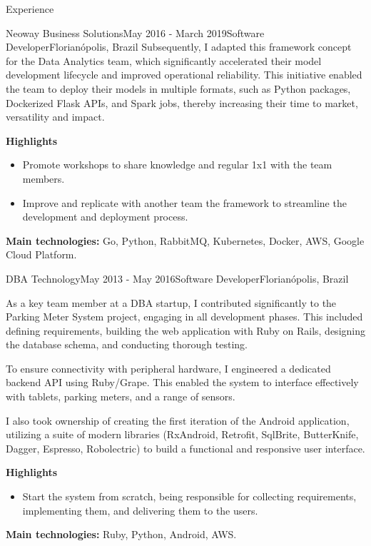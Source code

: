 \documentclass[
	a4paper, %
	10pt, %
]{resume} %
\begin{document}
\begin{rSection}{Experience}
\begin{rSubsection}{Neoway Business Solutions}{May 2016 - March 2019}{Software Developer}{Florianópolis, Brazil}
		Subsequently, I adapted this framework concept for the Data Analytics team, which significantly accelerated their model development lifecycle and improved operational reliability.
		This initiative enabled the team to deploy their models in multiple formats, such as Python packages, Dockerized Flask APIs, and Spark jobs, thereby increasing their time to market, versatility and impact.

		\textbf{Highlights}
		\begin{itemize}
			\item Promote workshops to share knowledge and regular 1x1 with the team members.
			\item Improve and replicate with another team the framework to streamline the development and deployment process.
		\end{itemize}

		\textbf{Main technologies:}
			Go, Python, RabbitMQ, Kubernetes, Docker, AWS, Google Cloud Platform.

	\end{rSubsection}


	\begin{rSubsection}{DBA Technology}{May 2013 - May 2016}{Software Developer}{Florianópolis, Brazil}
		\item[]
		As a key team member at a DBA startup, I contributed significantly to the Parking Meter System project, engaging in all development phases. This included defining requirements, building the web application with Ruby on Rails, designing the database schema, and conducting thorough testing.

		To ensure connectivity with peripheral hardware, I engineered a dedicated backend API using Ruby/Grape. This enabled the system to interface effectively with tablets, parking meters, and a range of sensors.

		I also took ownership of creating the first iteration of the Android application, utilizing a suite of modern libraries (RxAndroid, Retrofit, SqlBrite, ButterKnife, Dagger, Espresso, Robolectric) to build a functional and responsive user interface.

		\textbf{Highlights}
		\begin{itemize}
			\item Start the system from scratch, being responsible for collecting requirements, implementing them, and delivering them to the users.
		\end{itemize}

		\textbf{Main technologies:}
			Ruby, Python, Android, AWS.

	\end{rSubsection}

\end{rSection}
\end{document}
